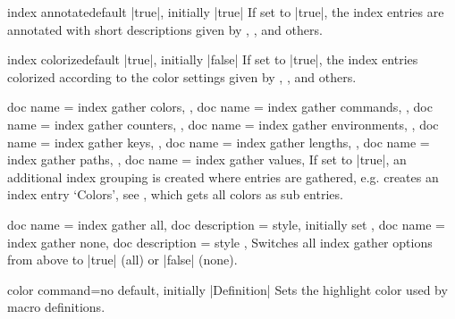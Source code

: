 \clearpage
\enlargethispage*{1cm}

\begin{docTcbKey}{index annotate}{}{default |true|, initially |true|}
  If set to |true|, the index entries are annotated with short descriptions
  given by , ,
  and others.
\end{docTcbKey}

\begin{docTcbKey}{index colorize}{}{default |true|, initially |false|}
  If set to |true|, the index entries colorized according to the color
  settings given by , ,
  and others.
\end{docTcbKey}


\begin{docTcbKeys}[
    doc new={2022-06-20},
    doc parameter = {\colOpt{=true\textbar false}},
    doc description = {default |true|, initially |true|}
  ]
  {
    {
      doc name        = index gather colors,
    },
    {
      doc name        = index gather commands,
    },
    {
      doc name        = index gather counters,
    },
    {
      doc name        = index gather environments,
    },
    {
      doc name        = index gather keys,
    },
    {
      doc name        = index gather lengths,
    },
    {
      doc name        = index gather paths,
    },
    {
      doc name        = index gather values,
    }
  }
  If set to |true|, an additional index grouping is created where entries
  are gathered, e.g.  creates an index
  entry `Colors', see , which gets all colors
  as sub entries.
\end{docTcbKeys}


\begin{docTcbKeys}[
    doc new={2022-06-20},
    doc parameter = {},
  ]
  {
    {
      doc name        = index gather all,
      doc description = {style, initially set}
    },
    {
      doc name        = index gather none,
      doc description = {style}
    },
  }
  Switches all index gather options from above to |true| (all) or |false| (none).
\end{docTcbKeys}



\begin{docTcbKey}{color command}{=}{no default, initially |Definition|}
  Sets the highlight color used by macro definitions.
\end{docTcbKey}

